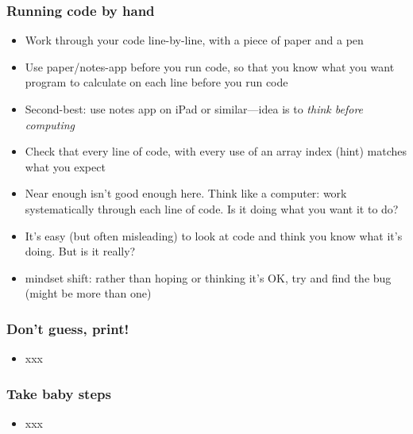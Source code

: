 \documentclass[english,14pt]{beamer}
\begin{document}

\begin{frame}[fragile]

\frametitle{Running code by hand}

\begin{itemize}
	\item Work through your code line-by-line, with a piece of paper and a pen
	\item Use paper/notes-app before you run code, so that you know what you want program to calculate on each line before you run code
	\item Second-best: use notes app on iPad or similar---idea is to \emph{think before computing}
	\item Check that every line of code, with every use of an array index (hint) matches what you expect
	\item Near enough isn't good enough here. Think like a computer: work systematically through each line of code. Is it doing what you want it to do?
	\item It's easy (but often misleading) to look at code and think you know what it's doing. But is it really?
	\item mindset shift: rather than hoping or thinking it's OK, try and find the bug (might be more than one)
\end{itemize}

\end{frame}


\begin{frame}[fragile]

\frametitle{Don't guess, print!}

\begin{itemize}
	\item xxx
\end{itemize}

\end{frame}


\begin{frame}[fragile]

\frametitle{Take baby steps}

\begin{itemize}
	\item xxx
\end{itemize}

\end{frame}
\end{document}
